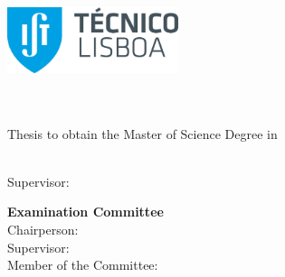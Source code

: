 
\noindent\includegraphics[width=5cm]{images/ist_logo}%
%
\\[5cm]%
%
\begin{center}
{\LARGE \textbf{\Title}}%
{\Large \Subtitle}%
%
\\[1.5cm]%
%
{\Large \textbf{\StudentName}}%
%
\\[1.5cm]%
%
{\large Thesis to obtain the Master of Science Degree in}\\[0.50cm]%
{\LARGE \textbf{\DegreeName}}%
%
\\[1.5cm]%
%
\begin{minipage}[t]{1\textwidth}
  \center
  {\large Supervisor:~~}{\Supervisors}
\end{minipage}%
%
\vfil%
%
\begin{minipage}[t]{1\textwidth}
  \center
  {\Large \textbf{Examination Committee}}\\[.25cm]
  {\large Chairperson: \Chairperson}\\
  {\large Supervisor: \Advisor}\\
  {\large Member of the Committee: \CommitteeMembers}
\end{minipage}%
%
\vfil%
%
{\Large \textbf{\Month\:\Year}}%
\end{center}%
